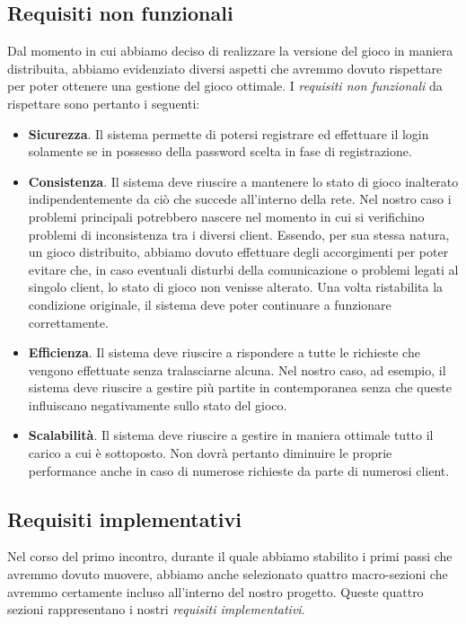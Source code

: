 	\clearpage
        \subsection {Requisiti non funzionali}\label{subsec:requirements:notFunctional}
        Dal momento in cui abbiamo deciso di realizzare la versione del gioco in maniera distribuita, abbiamo evidenziato diversi aspetti che avremmo dovuto rispettare per poter ottenere una gestione del gioco ottimale. I \textit{requisiti non funzionali} da rispettare sono pertanto i seguenti:
        
        \begin{itemize}
        \item \textbf{Sicurezza}. Il sistema permette di potersi registrare ed effettuare il login solamente se in possesso della password scelta in fase di registrazione.
        \item 	\textbf{Consistenza}. Il sistema deve riuscire a mantenere lo stato di gioco inalterato indipendentemente da ciò che succede all'interno della rete. Nel nostro caso i problemi principali potrebbero nascere nel momento in cui si verifichino problemi di inconsistenza tra i diversi client. Essendo, per sua stessa natura, un gioco distribuito, abbiamo dovuto effettuare degli accorgimenti per poter evitare che, in caso eventuali disturbi della comunicazione o problemi legati al singolo client, lo stato di gioco non venisse alterato. Una volta ristabilita la condizione originale, il sistema deve poter continuare a funzionare correttamente. 
        \item \textbf{Efficienza}. Il sistema deve riuscire a rispondere a tutte le richieste che vengono effettuate senza tralasciarne alcuna. Nel nostro caso, ad esempio, il sistema deve riuscire a gestire più partite in contemporanea senza che queste influiscano negativamente sullo stato del gioco.
        \item \textbf{Scalabilità}. Il sistema deve riuscire a gestire in maniera ottimale tutto il carico a cui è sottoposto. Non dovrà pertanto diminuire le proprie performance anche in caso di numerose richieste da parte di numerosi client.
        \end{itemize}
        
        \subsection {Requisiti implementativi}\label{subsec:requirements:implementative}
   	Nel corso del primo incontro, durante il quale abbiamo stabilito i primi passi che avremmo dovuto muovere, abbiamo anche selezionato quattro macro-sezioni che avremmo certamente incluso all'interno del nostro progetto. Queste quattro sezioni rappresentano i nostri \textit{requisiti implementativi}.
	
